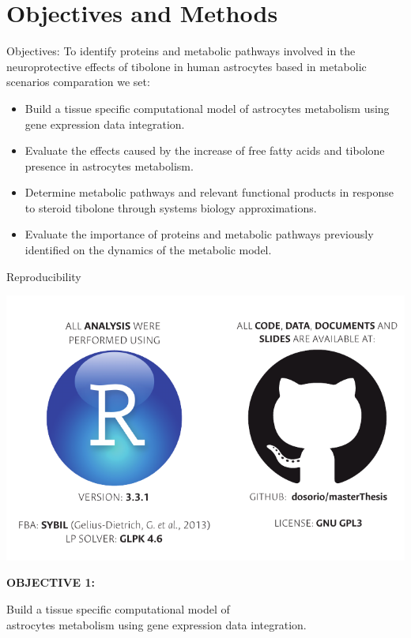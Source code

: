 \documentclass[11pt]{beamer}
\begin{document}
\section{Objectives and Methods}
\begin{frame}{Objectives:}
To identify proteins and metabolic pathways involved in the neuroprotective effects of tibolone in human astrocytes based in metabolic scenarios comparation we set:
\begin{itemize}
\item Build a tissue specific computational model of astrocytes metabolism using gene expression data integration.
\item Evaluate the effects caused by the increase of free fatty acids and tibolone presence in astrocytes metabolism.
\item Determine metabolic pathways and relevant functional products in response to steroid tibolone through systems biology approximations.
\item Evaluate the importance of proteins and metabolic pathways previously identified on the dynamics of the metabolic model.
\end{itemize}
\end{frame}
\begin{frame}{Reproducibility}
\begin{center}
\includegraphics[width=\textwidth]{Materials}
\end{center}
\end{frame}
\begin{frame}
\begin{block}{\textbf{OBJECTIVE 1:}}
\begin{center}
Build a tissue specific computational model of \\astrocytes metabolism using gene expression data integration.
\end{center}\end{block}
\end{frame}
\end{document}
